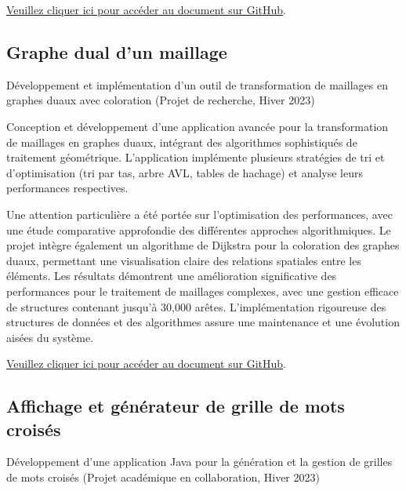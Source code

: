 \documentclass{article}
\begin{document}
    \href{https://github.com/jafarizadeh/CV---lettre/tree/a64fa195620766a9cf39fd42a2fd963779d13f6f/Document/Projets/Co-author}{Veuillez cliquer ici pour accéder au document sur GitHub}.
    
    \newpage

    \subsection{Graphe dual d’un maillage}

    Développement et implémentation d'un outil de transformation de maillages en graphes duaux avec coloration (Projet de recherche, Hiver 2023)

    Conception et développement d'une application avancée pour la transformation de maillages en graphes duaux, intégrant des algorithmes sophistiqués de traitement géométrique. L'application implémente plusieurs stratégies de tri et d'optimisation (tri par tas, arbre AVL, tables de hachage) et analyse leurs performances respectives.
    
    Une attention particulière a été portée sur l'optimisation des performances, avec une étude comparative approfondie des différentes approches algorithmiques. Le projet intègre également un algorithme de Dijkstra pour la coloration des graphes duaux, permettant une visualisation claire des relations spatiales entre les éléments. Les résultats démontrent une amélioration significative des performances pour le traitement de maillages complexes, avec une gestion efficace de structures contenant jusqu'à 30,000 arêtes. L'implémentation rigoureuse des structures de données et des algorithmes assure une maintenance et une évolution aisées du système.
    \newline
    \newline
    \newline

    \href{https://github.com/jafarizadeh/CV---lettre/tree/a64fa195620766a9cf39fd42a2fd963779d13f6f/Document/Projets/Co-author}{Veuillez cliquer ici pour accéder au document sur GitHub}.
    \newpage


    \subsection{Affichage et générateur de grille de mots croisés}

    Développement d'une application Java pour la génération et la gestion de grilles de mots croisés (Projet académique en collaboration, Hiver 2023)
\end{document}
